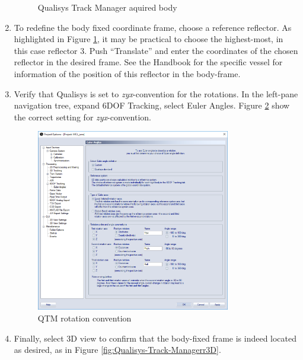 \documentclass[a4paper,english]{report}
\begin{document}
\begin{enumerate}
\begin{figure}[!h]
		\caption{Qualisys Track Manager aquired body}
		\label{fig:Qualisys-Track-ManagerAquiredBody}
	\end{figure}
	\item To redefine the body fixed coordinate frame, choose a reference reflector. As highlighted in Figure \ref{fig:Qualisys-Track-ManagerAquiredBody}, it may be practical to choose the highest-most, in this case reflector 3. Push ``Translate'' and enter the coordinates of the chosen reflector in the desired frame. See the Handbook for the specific vessel for information of the position of this reflector in the body-frame. 
	\item Verify that Qualisys is set to \textit{zyx}-convention for the rotations. In the left-pane navigation tree, expand 6DOF Tracking, select Euler Angles. Figure \ref{fig:QTM_euler} show the correct setting for \textit{zyx}-convention. 
	\begin{figure}[h!]
		\centering
		\includegraphics[width=0.8\textwidth]{fig/QTM_euler.png}
		\caption{QTM rotation convention}
		\label{fig:QTM_euler}
	\end{figure}
	\item Finally, select 3D view to confirm that the body-fixed frame is indeed located as desired, as in Figure \ref{fig:Qualisys-Track-Managerr3D}.
	\begin{figure}[!h]

\end{figure}
\end{enumerate}
\end{document}
